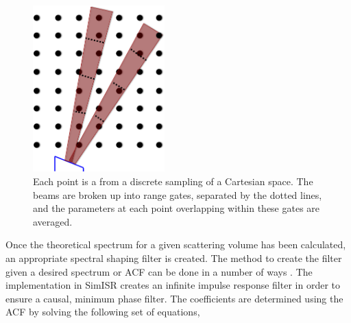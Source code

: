 \documentclass[draft,ras]{agutex}
\begin{document}
\begin{article}
\begin{figure}[!t]
\centering
\includegraphics[width=2in]{beamsampling}
\caption{Each point is a from a discrete sampling of a Cartesian space. The beams are broken up into range gates, separated by the dotted lines, and the parameters at each point overlapping within these gates are averaged.}
\label{fig:beamdia}
\end{figure}
 


Once the theoretical spectrum for a given scattering volume has been calculated, an appropriate spectral shaping filter is created. The method to create the filter given a desired spectrum or ACF can be done in a number of ways \citep{Kasdin:1995wi}. The implementation in SimISR creates an infinite impulse response filter in order to ensure a causal, minimum phase filter. 
The coefficients are determined using the ACF by solving the following set of equations,


\end{article}
\end{document}
